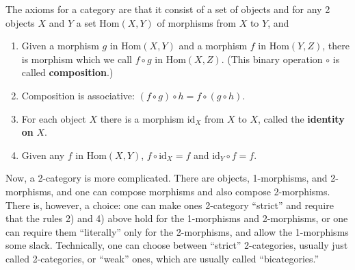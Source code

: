 \documentclass{article}
\def\tightlist{}
\begin{document}
The axioms for a category are that it consist of a set of objects and
for any 2 objects \(X\) and \(Y\) a set \(\mathrm{Hom}(X,Y)\) of
morphisms from \(X\) to \(Y\), and

\begin{enumerate}
\def\labelenumi{\arabic{enumi}.}
\tightlist
\item
  Given a morphism \(g\) in \(\mathrm{Hom}(X,Y)\) and a morphism \(f\)
  in \(\mathrm{Hom}(Y,Z)\), there is morphism which we call
  \(f \circ g\) in \(\mathrm{Hom}(X,Z)\). (This binary operation
  \(\circ\) is called \textbf{composition}.)
\item
  Composition is associative:
  \((f \circ g) \circ h = f \circ (g \circ h)\).
\item
  For each object \(X\) there is a morphism \(\mathrm{id}_X\) from \(X\)
  to \(X\), called the \textbf{identity on} \(X\).
\item
  Given any \(f\) in \(\mathrm{Hom}(X,Y)\),
  \(f \circ \mathrm{id}_X = f\) and \(\mathrm{id}_Y \circ f = f\).
\end{enumerate}

Now, a 2-category is more complicated. There are objects, 1-morphisms,
and 2-morphisms, and one can compose morphisms and also compose
2-morphisms. There is, however, a choice: one can make ones 2-category
``strict'' and require that the rules 2) and 4) above hold for the
1-morphisms and 2-morphisms, or one can require them ``literally'' only
for the 2-morphisms, and allow the 1-morphisms some slack. Technically,
one can choose between ``strict'' 2-categories, usually just called
2-categories, or ``weak'' ones, which are usually called
``bicategories.''
\end{document}
